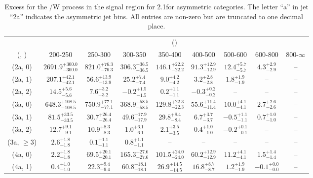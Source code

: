\begin{table}[h!]
\tiny
\centering
\caption{Excess for the \ttbar/W process in the signal region for 2.1\ifb for asymmetric categories. The letter ``a'' in jet \eg ``2a''  indicates the asymmetric jet bins. All entries are non-zero but are truncated to one decimal place.\label{tab:excesssep_sig_ttw_asym}}
\begin{tabular}
{ccccccccc}
	\hline\hline
	& \multicolumn{8}{c}{\scalht (\gev)} \\ 
	 (\njet,  \nb) & 200-250 & 250-300 & 300-350 & 350-400 & 400-500 & 500-600 & 600-800 & 800-$\infty$ \\ [0.8ex] 
\hline
	(2a, 0) & $2691.9^{+ 300.0 }_{- 300.0 }$ & $821.0^{+ 76.3 }_{- 76.3 }$ & $306.3^{+ 36.5 }_{- 36.5 }$ & $146.1^{+ 22.2 }_{- 22.2 }$ & $91.3^{+ 12.9 }_{- 12.9 }$ & $12.4^{+ 5.7 }_{- 5.7 }$ & $4.3^{+ 2.9 }_{- 2.9 }$ & -- \\[0.5ex] 
	(2a, 1) & $207.1^{+ 42.1 }_{- 42.1 }$ & $56.6^{+ 13.9 }_{- 13.9 }$ & $25.2^{+ 7.4 }_{- 7.4 }$ & $9.0^{+ 4.2 }_{- 4.2 }$ & $3.2^{+ 2.8 }_{- 2.8 }$ & $1.8^{+ 1.9 }_{- 1.9 }$ & -- & -- \\[0.5ex] 
	(2a, 2) & $14.5^{+ 5.6 }_{- 5.6 }$ & $7.6^{+ 3.2 }_{- 3.2 }$ & $-0.2^{+ 1.5 }_{- 1.5 }$ & $0.2^{+ 1.1 }_{- 1.1 }$ & $-0.3^{+ 0.2 }_{- 0.2 }$ & -- & -- & -- \\[0.5ex] 
	(3a, 0) & $648.3^{+ 108.5 }_{- 108.5 }$ & $750.9^{+ 77.1 }_{- 77.1 }$ & $368.9^{+ 58.5 }_{- 58.5 }$ & $129.8^{+ 22.3 }_{- 22.3 }$ & $55.6^{+ 11.4 }_{- 11.4 }$ & $10.0^{+ 4.1 }_{- 4.1 }$ & $2.7^{+ 2.6 }_{- 2.6 }$ & -- \\[0.5ex] 
	(3a, 1) & $81.5^{+ 33.5 }_{- 33.5 }$ & $30.7^{+ 26.4 }_{- 26.4 }$ & $49.6^{+ 17.9 }_{- 17.9 }$ & $29.8^{+ 8.4 }_{- 8.4 }$ & $6.7^{+ 3.7 }_{- 3.7 }$ & $-0.5^{+ 1.1 }_{- 1.1 }$ & $0.7^{+ 1.0 }_{- 1.0 }$ & -- \\[0.5ex] 
	(3a, 2) & $12.7^{+ 9.1 }_{- 9.1 }$ & $10.9^{+ 8.3 }_{- 8.3 }$ & $1.0^{+ 6.1 }_{- 6.1 }$ & $2.1^{+ 3.5 }_{- 3.5 }$ & $0.4^{+ 1.0 }_{- 1.0 }$ & $-0.2^{+ 0.1 }_{- 0.1 }$ & -- & -- \\[0.5ex] 
	(3a, $\ge3$) & $2.6^{+ 1.8 }_{- 1.8 }$ & $0.1^{+ 1.1 }_{- 1.1 }$ & $0.8^{+ 1.1 }_{- 1.1 }$ & -- & -- & -- & -- & -- \\[0.5ex] 
	(4a, 0) & $2.2^{+ 1.8 }_{- 1.8 }$ & $69.5^{+ 20.1 }_{- 20.1 }$ & $165.3^{+ 27.6 }_{- 27.6 }$ & $101.5^{+ 24.0 }_{- 24.0 }$ & $60.2^{+ 12.9 }_{- 12.9 }$ & $11.2^{+ 4.1 }_{- 4.1 }$ & $1.5^{+ 1.4 }_{- 1.4 }$ & -- \\[0.5ex] 
	(4a, 1) & $0.4^{+ 1.0 }_{- 1.0 }$ & $22.3^{+ 9.4 }_{- 9.4 }$ & $60.8^{+ 18.1 }_{- 18.1 }$ & $26.9^{+ 14.5 }_{- 14.5 }$ & $16.8^{+ 8.7 }_{- 8.7 }$ & $1.2^{+ 1.9 }_{- 1.9 }$ & $-0.1^{+ 0.0 }_{- 0.0 }$ & -- \\[0.5ex] 

\end{tabular}
\end{table}
